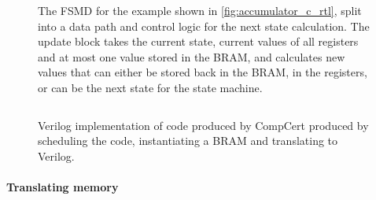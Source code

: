 \begin{figure}
\caption[Diagram of the FSMD for the example.]{The FSMD for the example shown in
  \cref{fig:accumulator_c_rtl}, split into a data path and control logic for the
  next state calculation.  The update block takes the current state, current
  values of all registers and at most one value stored in the \gls{BRAM}, and
  calculates new values that can either be stored back in the \gls{BRAM}, in the
  registers, or can be the next state for the state
  machine.}\label{fig:accumulator_diagram}
\end{figure}

\begin{figure}
  \centering
  \inputminted[fontsize=\footnotesize,linenos,xleftmargin=20pt]{systemverilog}{figures/3-introduction-to-vericert/translated-verilog.sv}
  \caption[Verilog implementation of the \textsc{Rtl} code.]{Verilog
    implementation of \rtl{} code produced by CompCert produced by scheduling
    the code, instantiating a BRAM and translating to Verilog.}
  \label{fig:accumulator_v}
\end{figure}

\paragraph{Translating memory}

